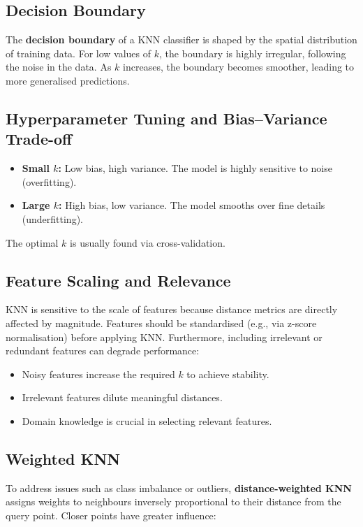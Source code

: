 \documentclass[9pt]{extarticle}
\begin{document}
\subsection{Decision Boundary}

The \textbf{decision boundary} of a KNN classifier is shaped by the spatial distribution of training data. For low values of $k$, the boundary is highly irregular, following the noise in the data. As $k$ increases, the boundary becomes smoother, leading to more generalised predictions.

\subsection{Hyperparameter Tuning and Bias–Variance Trade-off}

\begin{itemize}
    \item \textbf{Small $k$:} Low bias, high variance. The model is highly sensitive to noise (overfitting).
    \item \textbf{Large $k$:} High bias, low variance. The model smooths over fine details (underfitting).
\end{itemize}
The optimal $k$ is usually found via cross-validation.

\subsection{Feature Scaling and Relevance}

KNN is sensitive to the scale of features because distance metrics are directly affected by magnitude. Features should be standardised (e.g., via z-score normalisation) before applying KNN. Furthermore, including irrelevant or redundant features can degrade performance:

\begin{itemize}
    \item Noisy features increase the required $k$ to achieve stability.
    \item Irrelevant features dilute meaningful distances.
    \item Domain knowledge is crucial in selecting relevant features.
\end{itemize}

\subsection{Weighted KNN}

To address issues such as class imbalance or outliers, \textbf{distance-weighted KNN} assigns weights to neighbours inversely proportional to their distance from the query point. Closer points have greater influence:
\end{document}
